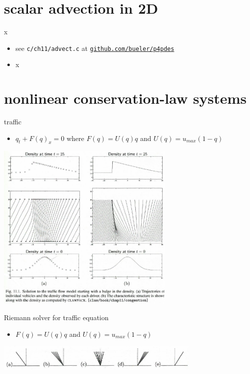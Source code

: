 \documentclass[10pt,hyperref]{beamer}
\begin{document}
\section{scalar advection in 2D}

\begin{frame}{x}

\begin{itemize}
\item see \texttt{c/ch11/advect.c} at \href{https://github.com/bueler/p4pdes}{\texttt{github.com/bueler/p4pdes}}
\item x
\end{itemize}
\end{frame}


\section{nonlinear conservation-law systems}

\begin{frame}{traffic}

\begin{itemize}
\item $q_t + F(q)_x = 0$ where $F(q) = U(q) q$ and $U(q) = u_{max} (1-q)$
\end{itemize}

\hfill \includegraphics[width=0.65\textwidth]{figs/leveque11p1}
\end{frame}

\begin{frame}{Riemann solver for traffic equation}

\begin{itemize}
\item $F(q) = U(q) q$ and $U(q) = u_{max} (1-q)$
\end{itemize}

\hfill \includegraphics[width=0.75\textwidth]{figs/leveque12p1}
\end{frame}
\end{document}
